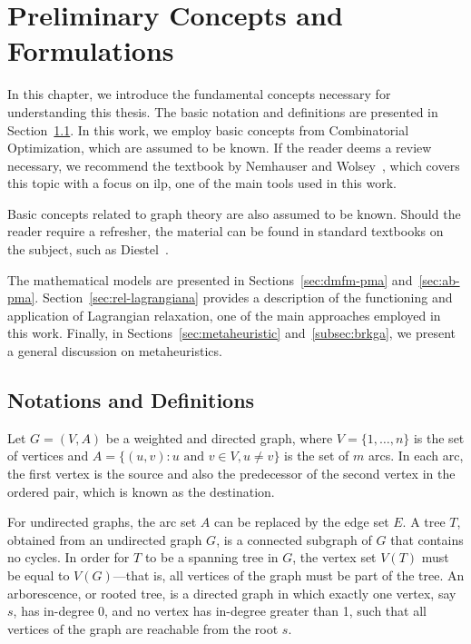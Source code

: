\chapter{Preliminary Concepts and Formulations}\label{chp:preliminary-concepts}

In this chapter, we introduce the fundamental concepts necessary for understanding this thesis. The basic notation and definitions are presented in Section~\ref{sec:not-e-def}. In this work, we employ basic concepts from Combinatorial Optimization, which are assumed to be known. If the reader deems a review necessary, we recommend the textbook by Nemhauser and Wolsey~\cite{Nemhauser}, which covers this topic with a focus on \gls{ilp}, one of the main tools used in this work. 

Basic concepts related to graph theory are also assumed to be known. Should the reader require a refresher, the material can be found in standard textbooks on the subject, such as Diestel~\cite{diestel:2005}. 

The mathematical models are presented in Sections~\ref{sec:dmfm-pma} and~\ref{sec:ab-pma}. Section~\ref{sec:rel-lagrangiana} provides a description of the functioning and application of Lagrangian relaxation, one of the main approaches employed in this work. Finally, in Sections~\ref{sec:metaheuristic} and~\ref{subsec:brkga}, we present a general discussion on metaheuristics.

\section{Notations and Definitions} \label{sec:not-e-def}

Let $G = (V, A)$ be a weighted and directed graph, where $V = \{1, \dots, n\}$ is the set of vertices and $A = \{(u, v) : u \text{ and } v \in V, u \neq v\}$ is the set of $m$ arcs. In each arc, the first vertex is the source and also the predecessor of the second vertex in the ordered pair, which is known as the destination.

For undirected graphs, the arc set $A$ can be replaced by the edge set $E$. A tree $T$, obtained from an undirected graph $G$, is a connected subgraph of $G$ that contains no cycles. In order for $T$ to be a spanning tree in $G$, the vertex set $V(T)$ must be equal to $V(G)$—that is, all vertices of the graph must be part of the tree. An arborescence, or rooted tree, is a directed graph in which exactly one vertex, say $s$, has in-degree 0, and no vertex has in-degree greater than 1, such that all vertices of the graph are reachable from the root $s$.

